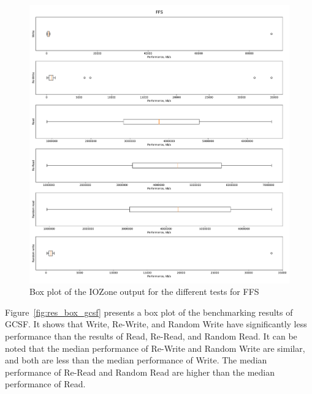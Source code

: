 \begin{figure}[!htb]
	\label{fig:res_box_ffs}
	\begin{center}
		\includegraphics[width=1.0\textwidth]{figures/benchmarking/ffs/FFS-box.pdf}
	\end{center}
	\caption{Box plot of the IOZone output for the different tests for \gls{FFS}}
\end{figure}

Figure~\ref{fig:res_box_gcsf} presents a box plot of the benchmarking results of \gls{GCSF}. It shows that Write, Re-Write, and Random Write have significantly less performance than the results of Read, Re-Read, and Random Read. It can be noted that the median performance of Re-Write and Random Write are similar, and both are less than the median performance of Write. The median performance of Re-Read and Random Read are higher than the median performance of Read.

